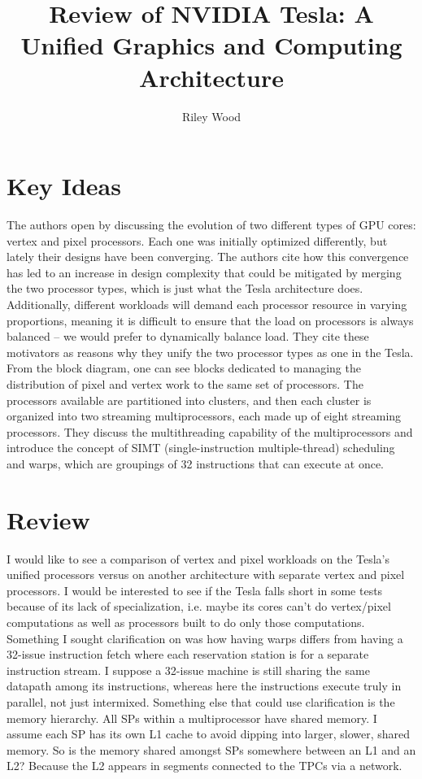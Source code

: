 \documentclass{article}
\title{Review of NVIDIA Tesla: A Unified Graphics and Computing Architecture \cite{Tesla}}
\author{Riley Wood}
\begin{document}
\maketitle


\section*{Key Ideas}
The authors open by discussing the evolution of two different types of GPU cores: vertex and pixel processors. Each one was initially optimized differently, but lately their designs have been converging. The authors cite how this convergence has led to an increase in design complexity that could be mitigated by merging the two processor types, which is just what the Tesla architecture does. Additionally, different workloads will demand each processor resource in varying proportions,
meaning it is difficult to ensure that the load on processors is always balanced -- we would prefer to dynamically balance load. They cite these motivators as reasons why they unify the two processor types as one in the Tesla. From the block diagram, one can see blocks dedicated to managing the distribution of pixel and vertex work to the same set of processors. The processors available are partitioned into clusters, and then each cluster is organized into two streaming multiprocessors,
each made up of eight streaming processors. They discuss the multithreading capability of the multiprocessors and introduce the concept of SIMT (single-instruction multiple-thread) scheduling and warps, which are groupings of 32 instructions that can execute at once.

\section*{Review}
I would like to see a comparison of vertex and pixel workloads on the Tesla's unified processors versus on another architecture with separate vertex and pixel processors. I would be interested to see if the Tesla falls short in some tests because of its lack of specialization, i.e. maybe its cores can't do vertex/pixel computations as well as processors built to do only those computations. Something I sought clarification on was how having warps differs from having a 32-issue instruction
fetch where each reservation station is for a separate instruction stream. I suppose a 32-issue machine is still sharing the same datapath among its instructions, whereas here the instructions execute truly in parallel, not just intermixed. Something else that could use clarification is the memory hierarchy. All SPs within a multiprocessor have shared memory. I assume each SP has its own L1 cache to avoid dipping into larger, slower, shared memory. So is the memory shared amongst SPs
somewhere between an L1 and an L2? Because the L2 appears in segments connected to the TPCs via a network.
\end{document}
